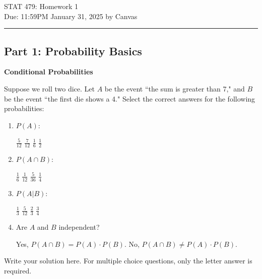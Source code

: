 \documentclass[12pt,letterpaper, onecolumn]{exam}
\begin{document}
\begingroup  
    \centering
    \LARGE STAT 479: Homework 1\\[0.5em]
    \large Due: 11:59PM January 31, 2025 by Canvas\\[0.5em]
\endgroup
\rule{\textwidth}{0.4pt}
\pointsdroppedatright   %
\printanswers
\renewcommand{\solutiontitle}{\noindent\textbf{Answer:}\enspace}


\begin{questions}
\section*{Part 1: Probability Basics}

\question[10 points]\textbf{Conditional Probabilities}\droppoints

Suppose we roll two dice. Let \( A \) be the event ``the sum is greater than 7," and \( B \) be the event ``the first die shows a 4." Select the correct answers for the following probabilities:
\begin{enumerate}[label=(\alph*)]
    \item \( P(A) \):
    \begin{choices}
        \choice \( \frac{5}{12} \)
        \choice \( \frac{7}{12} \)
        \choice \( \frac{1}{6} \)
        \choice \( \frac{1}{2} \)
    \end{choices}
    \item \( P(A \cap B) \):
    \begin{choices}
        \choice \( \frac{1}{6} \)
        \choice \( \frac{1}{12} \)
        \choice \( \frac{5}{36} \)
        \choice \( \frac{1}{4} \)
    \end{choices}
    \item \( P(A | B) \):
    \begin{choices}
        \choice \( \frac{1}{3} \)
        \choice \( \frac{5}{12} \)
        \choice \( \frac{2}{3} \)
        \choice \( \frac{3}{4} \)
    \end{choices}
    \item Are \( A \) and \( B \) independent?
    \begin{choices}
        \choice Yes, \( P(A \cap B) = P(A) \cdot P(B) \).
        \choice No, \( P(A \cap B) \neq P(A) \cdot P(B) \).
    \end{choices}
\end{enumerate}


\begin{solution}
        Write your solution here. For multiple choice questions, only the letter answer is required.
    \begin{parts}

\end{parts}
\end{solution}
\end{questions}
\end{document}
